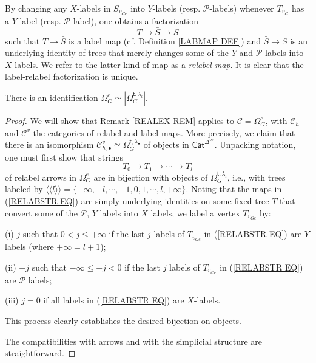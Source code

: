 \documentclass[a4paper,10pt]{article}%
\begin{document}
\begin{remark}
By changing any $X$-labels in $S_{v_{G e}}$ 
into $Y$-labels (resp. $\mathcal{P}$-labels)
whenever $T_{v_{G}}$  has a 
$Y$-label (resp. $\mathcal{P}$-label), one obtains a factorization
\[ T \to \bar{S} \to S \]
such that $T \to \bar{S}$ is a label map 
(cf. Definition \ref{LABMAP DEF})
and $\bar{S} \to S$ is an underlying identity of trees that
merely changes some of the $Y$ and $\mathcal{P}$ labels into 
$X$-labels.
We refer to the latter kind of map as a \textit{relabel map}.
It is clear that the label-relabel factorization 
 is unique.
\end{remark}

\begin{proposition}
There is an identification
$\Omega_G^e \simeq 
|\Omega_{G}^{\mathsf{t},\lambda_l}|$.
\end{proposition}


\begin{proof}
We will show that Remark \ref{REALEX REM} applies to 
$\mathcal{C} = \Omega_G^e$,
with $\mathcal{C}_h$ and $\mathcal{C}^v$ the categories of 
relabel and label maps.
More precisely, we claim that there is an isomorphism 
$\mathcal{C}_{h,\bullet}^{v} \simeq 
\Omega_{G}^{\mathsf{t},\lambda_{\bullet}}$
of objects in $\mathsf{Cat}^{\Delta^{op}}$.
Unpacking notation, one must first show that strings
\begin{equation}\label{RELABSTR EQ}
T_0 \to T_1 \to \cdots \to T_l
\end{equation}
 of relabel arrows in $\Omega_G^e$
 are in bijection with objects of 
 $\Omega_{G}^{\mathsf{t},\lambda_l}$,
 i.e., with trees labeled by
 $\langle \langle l \rangle \rangle =
  \{-\infty, -l, \cdots, -1,0,1,\cdots,l,+ \infty\}$.
Noting that the maps in
(\ref{RELABSTR EQ})
are simply underlying identities on some fixed tree $T$
that convert some of the $\mathcal{P}$, $Y$ labels into $X$ labels,
we label a vertex $T_{v_{Ge}}$ by:
\begin{inparaenum}
\item[(i)]
$j$ such that
$0 < j \leq +\infty$
if the last $j$ labels of $T_{v_{Ge}}$ in 
(\ref{RELABSTR EQ}) are $Y$ labels (where $+\infty = l+1$); 
\item[(ii)]
$-j$ such that
$-\infty \leq -j < 0$
if the last $j$ labels of $T_{v_{Ge}}$ in 
(\ref{RELABSTR EQ}) are $\mathcal{P}$ labels;
\item[(iii)] $j=0$ if all labels in (\ref{RELABSTR EQ})
are $X$-labels.
\end{inparaenum}
 This process clearly establishes the desired bijection on objects.

The compatibilities with arrows and with the simplicial structure are straightforward.
\end{proof}
\end{document}
